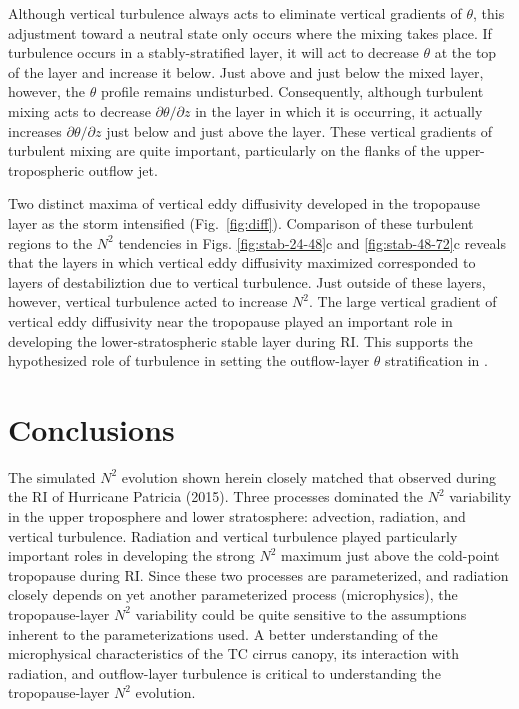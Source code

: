 \documentclass{ametsoc}
\begin{document}
Although vertical turbulence always acts to eliminate vertical gradients of $\theta$, this adjustment toward a neutral state only occurs where the mixing takes place.
If turbulence occurs in a stably-stratified layer, it will act to decrease $\theta$ at the top of the layer and increase it below.
Just above and just below the mixed layer, however, the $\theta$ profile remains undisturbed.
Consequently, although turbulent mixing acts to decrease $\partial \theta/\partial z$ in the layer in which it is occurring, it actually increases $\partial \theta/\partial z$ just below and just above the layer.
These vertical gradients of turbulent mixing are quite important, particularly on the flanks of the upper-tropospheric outflow jet.

Two distinct maxima of vertical eddy diffusivity developed in the tropopause layer as the storm intensified (Fig.~\ref{fig:diff}).
Comparison of these turbulent regions to the $N^2$ tendencies in Figs. \ref{fig:stab-24-48}c and \ref{fig:stab-48-72}c reveals that the layers in which vertical eddy diffusivity maximized corresponded to layers of destabiliztion due to vertical turbulence.
Just outside of these layers, however, vertical turbulence acted to increase $N^2$.
The large vertical gradient of vertical eddy diffusivity near the tropopause played an important role in developing the lower-stratospheric stable layer during RI.
This supports the hypothesized role of turbulence in setting the outflow-layer $\theta$ stratification in \cite{RotunnoEmanuel}.

  \section{Conclusions}

The simulated $N^2$ evolution shown herein closely matched that observed during the RI of Hurricane Patricia (2015).
Three processes dominated the $N^2$ variability in the upper troposphere and lower stratosphere: advection, radiation, and vertical turbulence.
Radiation and vertical turbulence played particularly important roles in developing the strong $N^2$ maximum just above the cold-point tropopause during RI.
Since these two processes are parameterized, and radiation closely depends on yet another parameterized process (microphysics), the tropopause-layer $N^2$ variability could be quite sensitive to the assumptions inherent to the parameterizations used.
A better understanding of the microphysical characteristics of the TC cirrus canopy, its interaction with radiation, and outflow-layer turbulence is critical to understanding the tropopause-layer $N^2$ evolution.
\end{document}
